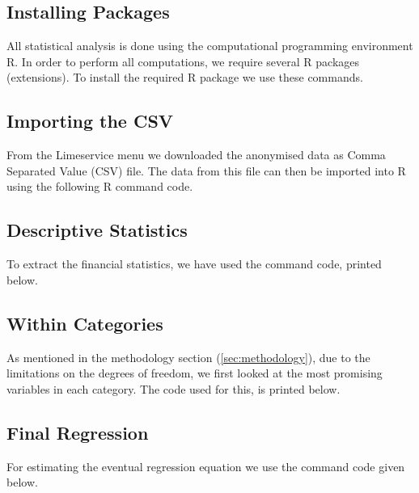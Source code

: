 \documentclass[twoside,12pt]{article}
\begin{document}
\subsection{Installing Packages}
All statistical analysis is done using the computational programming environment R. In order to perform all computations, we require several R packages (extensions). To install the required R package we use these commands.


\subsection{Importing the CSV}
From the Limeservice menu we downloaded the anonymised data as Comma Separated Value (CSV) file. The data from this file can then be imported into R using the following R command code.


\subsection{Descriptive Statistics}
To extract the financial statistics, we have used the command code, printed below.


\subsection{Within Categories}
As mentioned in the methodology section (\cref{sec:methodology}), due to the limitations on the degrees of freedom, we first looked at the most promising variables in each category. The code used for this, is printed below.


\subsection{Final Regression}
For estimating the eventual regression equation we use the command code given below.

\end{document}
